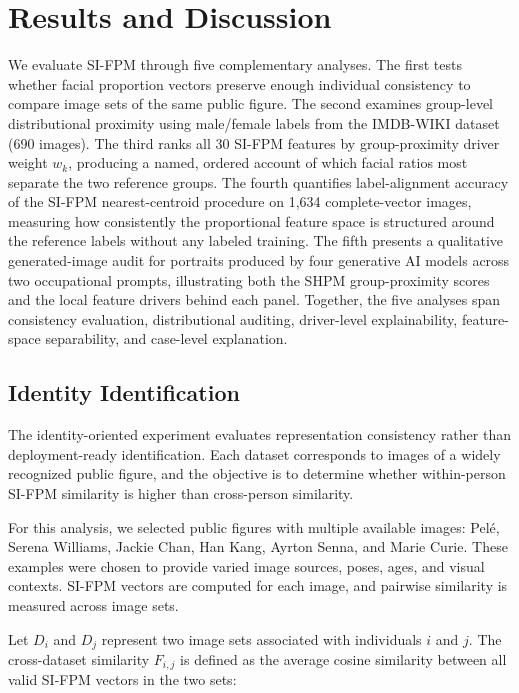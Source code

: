 \documentclass{article}
\begin{document}
\section{Results and Discussion}
\label{results_discussion}

We evaluate SI-FPM through five complementary analyses. The first tests whether facial proportion vectors preserve enough individual consistency to compare image sets of the same public figure. The second examines group-level distributional proximity using male/female labels from the IMDB-WIKI dataset (690 images). The third ranks all 30 SI-FPM features by group-proximity driver weight $w_k$, producing a named, ordered account of which facial ratios most separate the two reference groups. The fourth quantifies label-alignment accuracy of the SI-FPM nearest-centroid procedure on 1,634 complete-vector images, measuring how consistently the proportional feature space is structured around the reference labels without any labeled training. The fifth presents a qualitative generated-image audit for portraits produced by four generative AI models across two occupational prompts, illustrating both the SHPM group-proximity scores and the local feature drivers behind each panel. Together, the five analyses span consistency evaluation, distributional auditing, driver-level explainability, feature-space separability, and case-level explanation.


\subsection{Identity Identification}
\label{face_id}

The identity-oriented experiment evaluates representation consistency rather than deployment-ready identification. Each dataset corresponds to images of a widely recognized public figure, and the objective is to determine whether within-person SI-FPM similarity is higher than cross-person similarity.

For this analysis, we selected public figures with multiple available images: Pelé, Serena Williams, Jackie Chan, Han Kang, Ayrton Senna, and Marie Curie. These examples were chosen to provide varied image sources, poses, ages, and visual contexts. SI-FPM vectors are computed for each image, and pairwise similarity is measured across image sets.

Let \(D_i\) and \(D_j\) represent two image sets associated with individuals \(i\) and \(j\). The cross-dataset similarity \(F_{i,j}\) is defined as the average cosine similarity between all valid SI-FPM vectors in the two sets:
\end{document}
